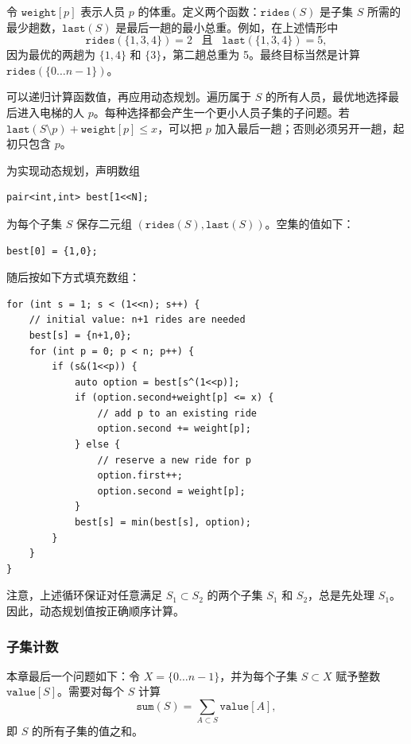 令 $\texttt{weight}[p]$ 表示人员 $p$ 的体重。定义两个函数：$\texttt{rides}(S)$ 是子集 $S$ 所需的最少趟数，$\texttt{last}(S)$ 是最后一趟的最小总重。例如，在上述情形中
\[ \texttt{rides}(\{1,3,4\})=2 \hspace{10pt} \textrm{且}
\hspace{10pt} \texttt{last}(\{1,3,4\})=5,\]
因为最优的两趟为 $\{1,4\}$ 和 $\{3\}$，第二趟总重为 5。最终目标当然是计算 $\texttt{rides}(\{0\ldots n-1\})$。

可以递归计算函数值，再应用动态规划。遍历属于 $S$ 的所有人员，最优地选择最后进入电梯的人 $p$。每种选择都会产生一个更小人员子集的子问题。若 $\texttt{last}(S\setminus p)+\texttt{weight}[p]\le x$，可以把 $p$ 加入最后一趟；否则必须另开一趟，起初只包含 $p$。

为实现动态规划，声明数组
\begin{lstlisting}
pair<int,int> best[1<<N];
\end{lstlisting}
为每个子集 $S$ 保存二元组 $(\texttt{rides}(S),\texttt{last}(S))$。空集的值如下：
\begin{lstlisting}
best[0] = {1,0};
\end{lstlisting}
随后按如下方式填充数组：

\begin{lstlisting}
for (int s = 1; s < (1<<n); s++) {
    // initial value: n+1 rides are needed
    best[s] = {n+1,0};
    for (int p = 0; p < n; p++) {
        if (s&(1<<p)) {
            auto option = best[s^(1<<p)];
            if (option.second+weight[p] <= x) {
                // add p to an existing ride
                option.second += weight[p];
            } else {
                // reserve a new ride for p
                option.first++;
                option.second = weight[p];
            }
            best[s] = min(best[s], option);
        }
    }
}
\end{lstlisting}
注意，上述循环保证对任意满足 $S_1\subset S_2$ 的两个子集 $S_1$ 和 $S_2$，总是先处理 $S_1$。因此，动态规划值按正确顺序计算。

\subsubsection{子集计数}

本章最后一个问题如下：令 $X=\{0\ldots n-1\}$，并为每个子集 $S\subset X$ 赋予整数 $\texttt{value}[S]$。需要对每个 $S$ 计算
\[\texttt{sum}(S) = \sum_{A \subset S} \texttt{value}[A],\]
即 $S$ 的所有子集的值之和。

